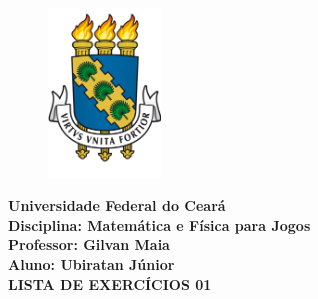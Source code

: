 \documentclass{abntex2}
\begin{document}
  \begin{center}
    \begin{figure}[h]
      \centering
      \includegraphics[width=3cm]{logo-ufc.PNG}
    \end{figure}
    \textbf{
      Universidade Federal do Ceará\\
      Disciplina: Matemática e Física para Jogos \\
      Professor: Gilvan Maia \\
      Aluno: Ubiratan Júnior \\
      LISTA DE EXERCÍCIOS 01 
    }
  \end{center}
\end{document}

